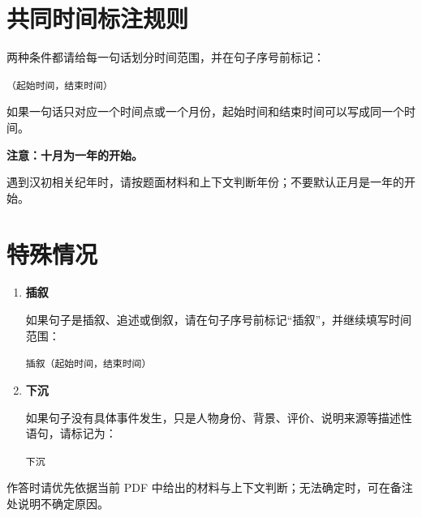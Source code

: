\documentclass[fontset=none,12pt,a4paper]{ctexart}
\newcommand{\markexample}[1]{\texttt{#1}}
\begin{document}
\section*{共同时间标注规则}
\begin{tcolorbox}[colback=white,colframe=black!25,title=时间范围]
两种条件都请给每一句话划分时间范围，并在句子序号前标记：

\vspace{0.4em}
\centerline{\Large\markexample{（起始时间，结束时间）}}
\vspace{0.4em}

如果一句话只对应一个时间点或一个月份，起始时间和结束时间可以写成同一个时间。
\end{tcolorbox}

\begin{tcolorbox}[colback=RuleGreen,colframe=RuleGreenLine,title=纪年规则]
\textbf{注意：十月为一年的开始。}

遇到汉初相关纪年时，请按题面材料和上下文判断年份；不要默认正月是一年的开始。
\end{tcolorbox}

\section*{特殊情况}
\begin{enumerate}
  \item \textbf{插叙}

  如果句子是插叙、追述或倒叙，请在句子序号前标记“插叙”，并继续填写时间范围：

  \vspace{0.2em}
  \centerline{\Large\markexample{插叙（起始时间，结束时间）}}

  \item \textbf{下沉}

  如果句子没有具体事件发生，只是人物身份、背景、评价、说明来源等描述性语句，请标记为：

  \vspace{0.2em}
  \centerline{\Large\markexample{下沉}}
\end{enumerate}

\vfill
\begin{tcolorbox}[colback=gray!6,colframe=black!20]
作答时请优先依据当前 PDF 中给出的材料与上下文判断；无法确定时，可在备注处说明不确定原因。
\end{tcolorbox}
\end{document}
